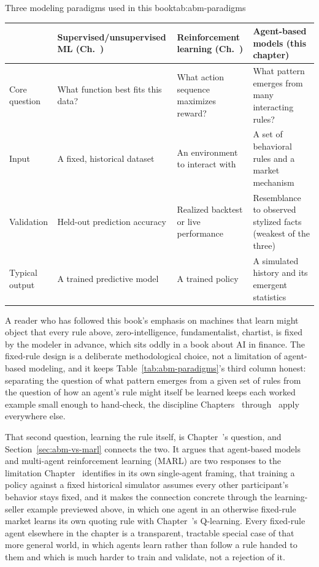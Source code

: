 \documentclass[../ai_in_finance]{subfiles}
\begin{document}
\begin{booktable}[htbp]{Three modeling paradigms used in this book}{tab:abm-paradigms}
\begin{tabular}{L{2.4cm}L{4.5cm}L{3.4cm}L{4.3cm}}
\toprule
 & Supervised/\allowbreak unsupervised ML (Ch.~) & Reinforcement learning (Ch.~) & Agent-based models (this chapter) \\
\midrule
Core question & What function best fits this data? & What action sequence maximizes reward? & What pattern emerges from many interacting rules? \\
Input & A fixed, historical dataset & An environment to interact with & A set of behavioral rules and a market mechanism \\
Validation & Held-out prediction accuracy & Realized backtest or live performance & Resemblance to observed stylized facts (weakest of the three) \\
Typical output & A trained predictive model & A trained policy & A simulated history and its emergent statistics \\
\bottomrule
\end{tabular}
\end{booktable}

A reader who has followed this book's emphasis on machines that learn might object that every rule above, zero-intelligence, fundamentalist, chartist, is fixed by the modeler in advance, which sits oddly in a book about AI in finance. The fixed-rule design is a deliberate methodological choice, not a limitation of agent-based modeling, and it keeps Table~\ref{tab:abm-paradigms}'s third column honest: separating the question of what pattern emerges from a given set of rules from the question of how an agent's rule might itself be learned keeps each worked example small enough to hand-check, the discipline Chapters~ through~ apply everywhere else.

That second question, learning the rule itself, is Chapter~'s question, and Section~\ref{sec:abm-vs-marl} connects the two. It argues that agent-based models and multi-agent reinforcement learning (MARL) are two responses to the limitation Chapter~ identifies in its own single-agent framing, that training a policy against a fixed historical simulator assumes every other participant's behavior stays fixed, and it makes the connection concrete through the learning-seller example previewed above, in which one agent in an otherwise fixed-rule market learns its own quoting rule with Chapter~'s Q-learning. Every fixed-rule agent elsewhere in the chapter is a transparent, tractable special case of that more general world, in which agents learn rather than follow a rule handed to them and which is much harder to train and validate, not a rejection of it.
\end{document}
